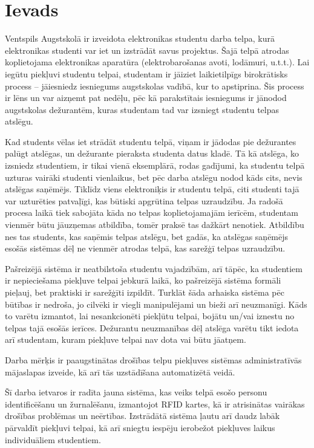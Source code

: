 \chapter*{Ievads}


Ventspils Augstskolā ir izveidota elektronikas studentu darba telpa, kurā elektronikas studenti var iet un izstrādāt savus projektus. Šajā telpā atrodas koplietojama elektronikas aparatūra (elektrobarošanas avoti, lodāmuri, u.t.t.). Lai iegūtu piekļuvi studentu telpai, studentam ir jāiziet laikietilpīgs birokrātisks process -- jāiesniedz iesniegums augstskolas vadībā, kur to apstiprina. Šis process ir lēns un var aizņemt pat nedēļu, pēc kā parakstītais iesniegums ir jānodod augstskolas dežurantēm, kuras studentam tad var izsniegt studentu telpas atslēgu.

Kad students vēlas iet strādāt studentu telpā, viņam ir jādodas pie dežurantes palūgt atslēgas, un dežurante pieraksta studenta datus kladē. Tā kā atslēga, ko izsniedz studentiem, ir tikai vienā eksemplārā, rodas gadījumi, ka studentu telpā uzturas vairāki studenti vienlaikus, bet pēc darba atslēgu nodod kāds cits, nevis atslēgas saņēmējs. Tiklīdz viens elektroniķis ir studentu telpā, citi studenti tajā var uzturēties patvaļīgi, kas būtiski apgrūtina telpas uzraudzību. Ja radošā procesa laikā tiek sabojāta kāda no telpas koplietojamajām ierīcēm, studentam vienmēr būtu jāuzņemas atbildība, tomēr praksē tas dažkārt nenotiek. Atbildību nes tas students, kas saņēmis telpas atslēgu, bet gadās, ka atslēgas saņēmējs esošās sistēmas dēļ ne vienmēr atrodas telpā, kas sarežģī telpas uzraudzību.

Pašreizējā sistēma ir neatbilstoša studentu vajadzībām, arī tāpēc, ka studentiem ir nepieciešama piekļuve telpai jebkurā laikā, ko pašreizējā sistēma formāli pieļauj, bet praktiski ir sarežģīti izpildīt. Turklāt šāda arhaiska sistēma pēc būtības ir nedroša, jo cilvēki ir viegli manipulējami un bieži arī neuzmanīgi. Kāds to varētu izmantot, lai nesankcionēti piekļūtu telpai, bojātu un/vai iznestu no telpas tajā esošās ierīces. Dežurantu neuzmanības dēļ atslēga varētu tikt iedota arī studentam, kuram piekļuve telpai nav dota vai būtu jāatņem.

Darba mērķis ir paaugstinātas drošības telpu piekļuves sistēmas administratīvās mājaslapas izveide, kā arī tās uzstādīšana automatizētā veidā.

Šī darba ietvaros ir radīta jauna sistēma, kas veiks telpā esošo personu identificēšanu un žurnalēšanu, izmantojot RFID kartes, kā ir atrisinātas vairākas drošības problēmas un neērtības. Izstrādātā sistēma ļautu arī daudz labāk pārvaldīt piekļuvi telpai, kā arī sniegtu iespēju ierobežot piekļuves laikus individuāliem studentiem.

